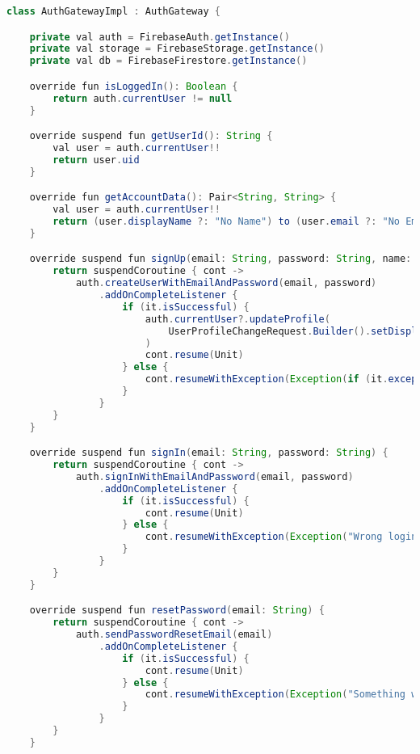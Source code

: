 \begin{lstlisting}[language=Java,label={lst:add:firebase}]
class AuthGatewayImpl : AuthGateway {

    private val auth = FirebaseAuth.getInstance()
    private val storage = FirebaseStorage.getInstance()
    private val db = FirebaseFirestore.getInstance()

    override fun isLoggedIn(): Boolean {
        return auth.currentUser != null
    }

    override suspend fun getUserId(): String {
        val user = auth.currentUser!!
        return user.uid
    }

    override fun getAccountData(): Pair<String, String> {
        val user = auth.currentUser!!
        return (user.displayName ?: "No Name") to (user.email ?: "No Email")
    }

    override suspend fun signUp(email: String, password: String, name: String) {
        return suspendCoroutine { cont ->
            auth.createUserWithEmailAndPassword(email, password)
                .addOnCompleteListener {
                    if (it.isSuccessful) {
                        auth.currentUser?.updateProfile(
                            UserProfileChangeRequest.Builder().setDisplayName(name).build()
                        )
                        cont.resume(Unit)
                    } else {
                        cont.resumeWithException(Exception(if (it.exception != null) it.exception!!.message else "Wrong login or password"))
                    }
                }
        }
    }

    override suspend fun signIn(email: String, password: String) {
        return suspendCoroutine { cont ->
            auth.signInWithEmailAndPassword(email, password)
                .addOnCompleteListener {
                    if (it.isSuccessful) {
                        cont.resume(Unit)
                    } else {
                        cont.resumeWithException(Exception("Wrong login or password"))
                    }
                }
        }
    }

    override suspend fun resetPassword(email: String) {
        return suspendCoroutine { cont ->
            auth.sendPasswordResetEmail(email)
                .addOnCompleteListener {
                    if (it.isSuccessful) {
                        cont.resume(Unit)
                    } else {
                        cont.resumeWithException(Exception("Something went wrong"))
                    }
                }
        }
    }


\end{lstlisting}
